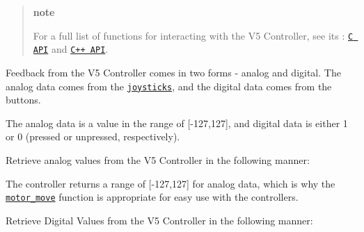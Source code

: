 \begin{quote}
{\bfseries note}

For a full list of functions for interacting with the V5 Controller, see its \+: \href{../../api/c/misc.html}{\tt C A\+PI} and \href{../../api/cpp/misc.html}{\tt C++ A\+PI}.

\end{quote}
Feedback from the V5 Controller comes in two forms -\/ analog and digital. The analog data comes from the \href{https://en.wikipedia.org/wiki/Analog_stick}{\tt joysticks}, and the digital data comes from the buttons.

The analog data is a value in the range of \mbox{[}-\/127,127\mbox{]}, and digital data is either 1 or 0 (pressed or unpressed, respectively).

Retrieve analog values from the V5 Controller in the following manner\+:

The controller returns a range of \mbox{[}-\/127,127\mbox{]} for analog data, which is why the \href{../../api/c/motors.html#motor-move}{\tt motor\+\_\+move} function is appropriate for easy use with the controllers.

Retrieve Digital Values from the V5 Controller in the following manner\+: 